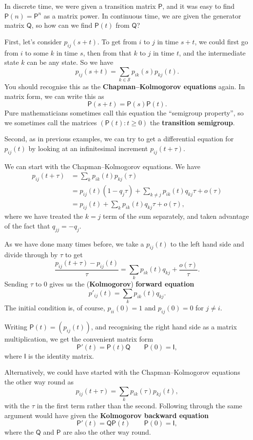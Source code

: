 \documentclass[
  a4paper,
]{article}
\theoremstyle{definition}
\theoremstyle{definition}
\theoremstyle{definition}
\theoremstyle{remark}
\begin{document}
In discrete time, we were given a transition matrix \(\mathsf P\), and it was easy to find \(\mathsf P(n) = \mathsf P^n\) as a matrix power. In continuous time, we are given the generator matrix \(\mathsf Q\), so how can we find \(\mathsf P(t)\) from \(\mathsf Q\)?

First, let's consider \(p_{ij}(s+t)\). To get from \(i\) to \(j\) in time \(s + t\), we could first go from \(i\) to some \(k\) in time \(s\), then from that \(k\) to \(j\) in time \(t\), and the intermediate state \(k\) can be any state. So we have
\[ p_{ij}(s+t) = \sum_{k\in \mathcal S} p_{ik}(s)p_{kj}(t) . \]
You should recognise this as the \textbf{Chapman--Kolmogorov equations} again. In matrix form, we can write this as
\[ \mathsf P(s+t) = \mathsf P(s) \mathsf P(t) . \]
Pure mathematicians sometimes call this equation the ``semigroup property'', so we sometimes call the matrices \((\mathsf P(t) : t \geq 0)\) the \textbf{transition semigroup}.

Second, as in previous examples, we can try to get a differential equation for \(p_{ij}(t)\) by looking at an infinitesimal increment \(p_{ij}(t+\tau)\).

We can start with the Chapman--Kolmogorov equations. We have
\begin{align*}
p_{ij}(t+\tau) &= \sum_k p_{ik}(t)p_{kj}(\tau) \\
&=p_{ij}(t)(1 - q_j\tau) + \sum_{k \neq j} p_{ik}(t)q_{kj}\tau +  o(\tau) \\
&= p_{ij}(t) + \sum_k p_{ik}(t)q_{kj}\tau + o(\tau) ,
\end{align*}
where we have treated the \(k = j\) term of the sum separately, and taken advantage of the fact that \(q_{jj} = - q_j\).

As we have done many times before, we take a \(p_{ij}(t)\) to the left hand side and divide through by \(\tau\) to get
\[ \frac{p_{ij}(t + \tau) - p_{ij}(t)}{\tau} = \sum_k p_{ik}(t)q_{kj} + \frac{o(\tau)}{\tau} . \]
Sending \(\tau\) to 0 gives us the (\textbf{Kolmogorov}) \textbf{forward equation}
\[ p'_{ij} (t) = \sum_k p_{ik}(t)q_{kj} . \]
The initial condition is, of course, \(p_{ii}(0) = 1\) and \(p_{ij}(0) = 0\) for \(j \neq i\).

Writing \(\mathsf P(t) = (p_{ij}(t))\), and recognising the right hand side as a matrix multiplication, we get the convenient matrix form
\[ \mathsf P'(t) = \mathsf{P}(t) \mathsf{Q}  \qquad \mathsf P(0) = \mathsf I ,\]
where \(\mathsf I\) is the identity matrix.

Alternatively, we could have started with the Chapman--Kolmogorov equations the other way round as
\[ p_{ij}(t+\tau) = \sum_k p_{ik}(\tau)p_{kj}(t) , \]
with the \(\tau\) in the first term rather than the second. Following through the same argument would have given the \textbf{Kolmogorov backward equation}
\[ \mathsf P'(t) = \mathsf{Q} \mathsf{P}(t)   \qquad \mathsf P(0) = \mathsf I ,\]
where the \(\mathsf Q\) and \(\mathsf P\) are also the other way round.
\end{document}
